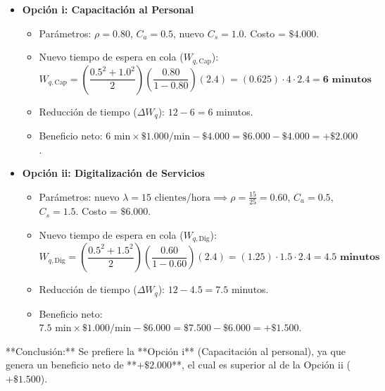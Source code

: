 \documentclass[11pt, a4paper]{article}
\begin{document}
\begin{itemize}
  \item \textbf{Opción i: Capacitación al Personal}
    \begin{itemize}
      \item Parámetros: $\rho = 0.80$, $C_a = 0.5$, nuevo $C_s = 1.0$. Costo = $\$4.000$.
      \item Nuevo tiempo de espera en cola ($W_{q,\text{Cap}}$):
        \[
          W_{q,\text{Cap}} = \left( \frac{0.5^2 + 1.0^2}{2} \right) \left( \frac{0.80}{1 - 0.80} \right) (2.4) = (0.625) \cdot 4 \cdot 2.4 = \mathbf{6 \text{ minutos}}
        \]
      \item Reducción de tiempo ($\Delta W_q$): $12 - 6 = 6$ minutos.
      \item Beneficio neto: $6 \text{ min} \times \$1.000/\text{min} - \$4.000 = \$6.000 - \$4.000 = \mathbf{+\$2.000}$.
    \end{itemize}

  \item \textbf{Opción ii: Digitalización de Servicios}
    \begin{itemize}
      \item Parámetros: nuevo $\lambda = 15 \text{ clientes/hora} \implies \rho = \frac{15}{25} = 0.60$, $C_a = 0.5$, $C_s = 1.5$. Costo = $\$6.000$.
      \item Nuevo tiempo de espera en cola ($W_{q,\text{Dig}}$):
        \[
          W_{q,\text{Dig}} = \left( \frac{0.5^2 + 1.5^2}{2} \right) \left( \frac{0.60}{1 - 0.60} \right) (2.4) = (1.25) \cdot 1.5 \cdot 2.4 = \mathbf{4.5 \text{ minutos}}
        \]
      \item Reducción de tiempo ($\Delta W_q$): $12 - 4.5 = 7.5$ minutos.
      \item Beneficio neto: $7.5 \text{ min} \times \$1.000/\text{min} - \$6.000 = \$7.500 - \$6.000 = \mathbf{+\$1.500}$.
    \end{itemize}
\end{itemize}

**Conclusión:** Se prefiere la **Opción i** (Capacitación al personal), ya que genera un beneficio neto de **$+\$2.000$**, el cual es superior al de la Opción ii ($+\$1.500$).
\end{document}
